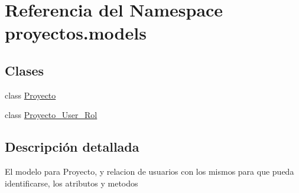 \hypertarget{namespaceproyectos_1_1models}{}\section{Referencia del Namespace proyectos.\+models}
\label{namespaceproyectos_1_1models}
\subsection*{Clases}
\begin{DoxyCompactItemize}
\item 
class \hyperlink{classproyectos_1_1models_1_1_proyecto}{Proyecto}
\item 
class \hyperlink{classproyectos_1_1models_1_1_proyecto___user___rol}{Proyecto\+\_\+\+User\+\_\+\+Rol}
\end{DoxyCompactItemize}


\subsection{Descripción detallada}
\begin{DoxyVerb}El modelo para Proyecto, y relacion de usuarios con los mismos para que pueda identificarse, los atributos y metodos\end{DoxyVerb}
 